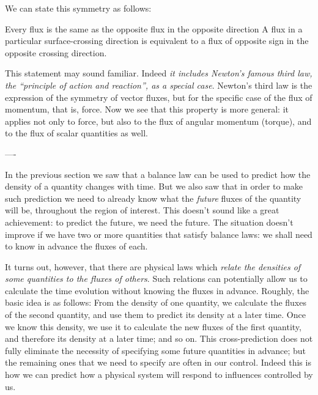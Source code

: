 We can state this symmetry as follows:
%
\begin{definition}{Every flux is the same as the opposite flux in the opposite direction}
  A flux  in a particular surface-crossing direction is equivalent to a flux of opposite sign in the opposite crossing direction.
\end{definition}
This statement may sound familiar. Indeed \emph{it includes Newton's famous third law, the \enquote{principle of action and reaction}, as a special case}. Newton's third law is the expression of the symmetry of vector fluxes, but for the specific case of the flux of momentum, that is, force. Now we see that this property is more general: it applies not only to force, but also to the flux of angular momentum (torque), and to the flux of scalar quantities as well.

\bigskip


----

In the previous section we saw that a balance law can be used to predict how the density of a quantity changes with time. But we also saw that in order to make such prediction we need to already know what the \emph{future} fluxes of the quantity will be, throughout the region of interest. This doesn't sound like a great achievement: to predict the future, we need the future. The situation doesn't improve if we have two or more quantities that satisfy balance laws: we shall need to know in advance the fluxes of each.

It turns out, however, that there are physical laws which \emph{relate the densities of some quantities to the fluxes of others}. Such relations can potentially allow us to calculate the time evolution without knowing the fluxes in advance. Roughly, the basic idea is as follows: From the density of one quantity, we calculate the fluxes of the second quantity, and use them to predict its density at a later time. Once we know this density, we use it to calculate the new fluxes of the first quantity, and therefore its density at a later time; and so on. This cross-prediction does not fully eliminate the necessity of specifying some future quantities in advance; but the remaining ones that we need to specify are often in our control. Indeed this is how we can predict how a physical system will respond to influences controlled by us.

